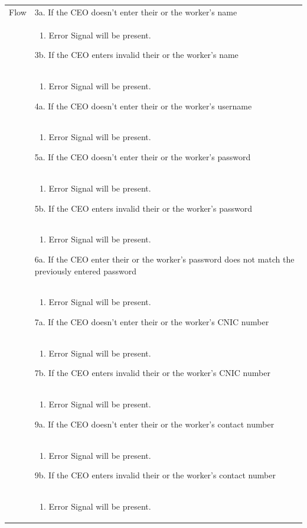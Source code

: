 \documentclass[12pt,a4paper]{report}
\begin{document}
\begin{tabular}{ | m{3cm} | m{12cm}| } \hline
Flow & 
3a. If the CEO doesn't enter their or the worker's name \\ 	
&	\begin{enumerate}
		\item Error Signal will be present.
	\end{enumerate}
3b. If the CEO enters invalid their or the worker's name \\ 	
&	\begin{enumerate}
		\item Error Signal will be present.
	\end{enumerate}
4a. If the CEO doesn't enter their or the worker's username\\ 	
&	\begin{enumerate}
		\item Error Signal will be present.
	\end{enumerate}
5a. If the CEO doesn't enter their or the worker's password \\ 	
&	\begin{enumerate}
		\item Error Signal will be present.
	\end{enumerate}
5b. If the CEO enters invalid their or the worker's password \\ 	
&	\begin{enumerate}
		\item Error Signal will be present.
	\end{enumerate}
6a. If the CEO enter their or the worker's password does not match the previously entered password \\ 	
&	\begin{enumerate}
		\item Error Signal will be present.
	\end{enumerate}
7a. If the CEO doesn't enter their or the worker's CNIC number\\ 	
&	\begin{enumerate}
		\item Error Signal will be present.
	\end{enumerate}
7b. If the CEO enters invalid their or the worker's CNIC number\\ 	
&	\begin{enumerate}
		\item Error Signal will be present.
	\end{enumerate}
9a. If the CEO doesn't enter their or the worker's contact number\\ 	
&	\begin{enumerate}
		\item Error Signal will be present.
	\end{enumerate}
9b. If the CEO enters invalid their or the worker's contact number\\ 	
&	\begin{enumerate}
		\item Error Signal will be present.
	\end{enumerate}
\\ \hline
\end{tabular}
\end{document}
